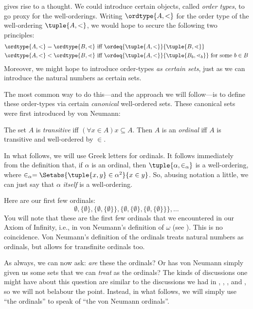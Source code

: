 \documentclass[../../../include/open-logic-section]{subfiles}
\begin{document}

 gives rise to a
thought. We could introduce certain objects, called \emph{order
types}, to go proxy for the well-orderings. Writing $\ordtype{A, <}$
for the order type of the well-ordering $\tuple{A, <}$, we would hope
to secure the following two principles:
\begin{align*}
	\ordtype{A, <} = \ordtype{B, \lessdot} & 
	\text{ iff } \ordeq{\tuple{A, <}}{\tuple{B, \lessdot}}\\
	\ordtype{A, <} < \ordtype{B, \lessdot}&
	\text{ iff }\ordeq{\tuple{A, <}}{\tuple{B_b, \lessdot_b}}\text{ for some }b \in B
\end{align*}
Moreover, we might hope to introduce order-types \emph{as certain
sets}, just as we can introduce the natural numbers as certain sets. 

The most common way to do this---and the approach we will follow---is
to define these order-types via certain \emph{canonical} well-ordered
sets. These canonical sets were first introduced by von Neumann:

\begin{defn}
The set $A$ is \emph{transitive} {iff} $(\forall x \in A)x \subseteq
A$. Then $A$ is an \emph{ordinal} {iff} $A$ is transitive and
well-ordered by $\in$.
\end{defn}
\noindent
In what follows, we will use Greek letters for ordinals. It follows
immediately from the definition that, if $\alpha$ is an ordinal, then
$\tuple{\alpha, \in_\alpha}$ is a well-ordering, where $\in_\alpha =
\Setabs{\tuple{x, y} \in \alpha^2}{x \in y}$. So, abusing notation a
little, we can just say that $\alpha$ \emph{itself} is a
well-ordering. 

Here are our first few ordinals:
\[
	\emptyset, \{\emptyset\}, 
	\{\emptyset, \{\emptyset\}\}, 
	\{\emptyset, \{\emptyset\}, \{\emptyset, \{\emptyset\}\}\}, \ldots
\]
You will note that these are the first few ordinals that we
encountered in our Axiom of Infinity, i.e., in von Neumann's
definition of $\omega$ (see ). This
is no coincidence. Von Neumann's definition of the ordinals treats
natural numbers as ordinals, but allows for transfinite ordinals too. 

As always, we can now ask: \emph{are} these the ordinals? Or has von
Neumann simply given us some sets that we can \emph{treat} as the
ordinals? The kinds of discussions one might have about this question
are similar to the discussions we had in ,
,
, and
, so we will not belabour the point.
Instead, in what follows, we will simply use ``the ordinals'' to speak
of ``the von Neumann ordinals''. 
\end{document}
